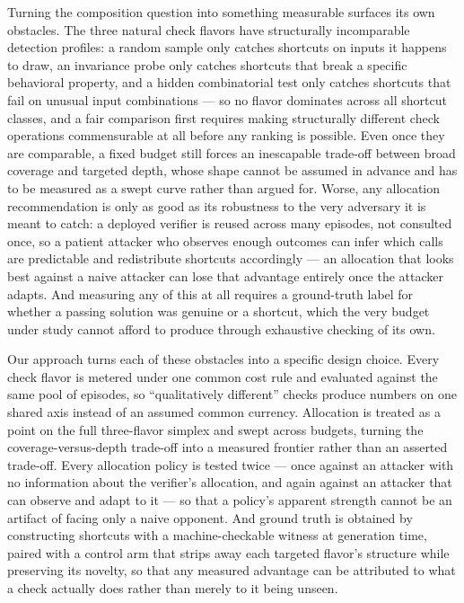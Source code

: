 \documentclass[11pt]{article}
\begin{document}
Turning the composition question into something measurable surfaces its own obstacles. The three natural check flavors have structurally incomparable detection profiles: a random sample only catches shortcuts on inputs it happens to draw, an invariance probe only catches shortcuts that break a specific behavioral property, and a hidden combinatorial test only catches shortcuts that fail on unusual input combinations --- so no flavor dominates across all shortcut classes, and a fair comparison first requires making structurally different check operations commensurable at all before any ranking is possible. Even once they are comparable, a fixed budget still forces an inescapable trade-off between broad coverage and targeted depth, whose shape cannot be assumed in advance and has to be measured as a swept curve rather than argued for. Worse, any allocation recommendation is only as good as its robustness to the very adversary it is meant to catch: a deployed verifier is reused across many episodes, not consulted once, so a patient attacker who observes enough outcomes can infer which calls are predictable and redistribute shortcuts accordingly --- an allocation that looks best against a naive attacker can lose that advantage entirely once the attacker adapts. And measuring any of this at all requires a ground-truth label for whether a passing solution was genuine or a shortcut, which the very budget under study cannot afford to produce through exhaustive checking of its own.

Our approach turns each of these obstacles into a specific design choice. Every check flavor is metered under one common cost rule and evaluated against the same pool of episodes, so ``qualitatively different'' checks produce numbers on one shared axis instead of an assumed common currency. Allocation is treated as a point on the full three-flavor simplex and swept across budgets, turning the coverage-versus-depth trade-off into a measured frontier rather than an asserted trade-off. Every allocation policy is tested twice --- once against an attacker with no information about the verifier's allocation, and again against an attacker that can observe and adapt to it --- so that a policy's apparent strength cannot be an artifact of facing only a naive opponent. And ground truth is obtained by constructing shortcuts with a machine-checkable witness at generation time, paired with a control arm that strips away each targeted flavor's structure while preserving its novelty, so that any measured advantage can be attributed to what a check actually does rather than merely to it being unseen.
\end{document}
